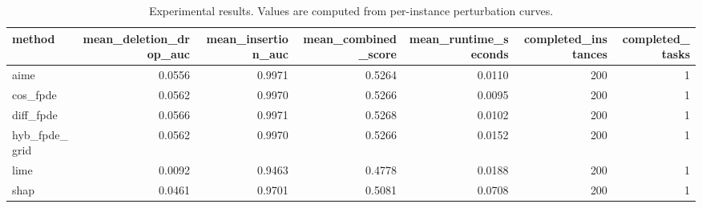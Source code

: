 \begin{table}[t]
\caption{Experimental results. Values are computed from per-instance perturbation curves.}
\label{tab:main_results_computed}
\centering
\begin{tabular}{lrrrrrr}
\toprule
method & mean\_deletion\_drop\_auc & mean\_insertion\_auc & mean\_combined\_score & mean\_runtime\_seconds & completed\_instances & completed\_tasks \\
\midrule
aime & 0.0556 & 0.9971 & 0.5264 & 0.0110 & 200 & 1 \\
cos\_fpde & 0.0562 & 0.9970 & 0.5266 & 0.0095 & 200 & 1 \\
diff\_fpde & 0.0566 & 0.9971 & 0.5268 & 0.0102 & 200 & 1 \\
hyb\_fpde\_grid & 0.0562 & 0.9970 & 0.5266 & 0.0152 & 200 & 1 \\
lime & 0.0092 & 0.9463 & 0.4778 & 0.0188 & 200 & 1 \\
shap & 0.0461 & 0.9701 & 0.5081 & 0.0708 & 200 & 1 \\
\bottomrule
\end{tabular}

\end{table}
